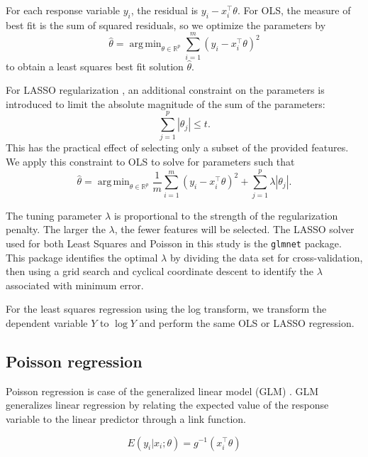 \documentclass[11pt]{report}
\DeclareMathOperator*{\argmin}{arg\,min}
\begin{document}
For each response variable $y_i$, the residual is $y_i - x_i^{\top}\theta$. For OLS, the measure of best fit is the sum of squared residuals, so we optimize the parameters by
\[\hat{\theta} = \argmin_{\theta\in\mathbb{R}^p}\sum_{i=1}^m \left(y_i - x_i^\top\theta\right)^2\] to obtain a least squares best fit solution $\hat{\theta}$.

For LASSO regularization \cite{Tibshirani1996}, an additional constraint on the parameters is introduced to limit the absolute magnitude of the sum of the parameters: 
\[\sum_{j=1}^p |\theta_j|\leq t.\] This has the practical effect of selecting only a subset of the provided features. We apply this constraint to OLS to solve for parameters such that
\[\hat{\theta} = \argmin_{\theta\in\mathbb{R}^p} \frac{1}{m}\sum_{i=1}^m \left(y_i - x_i^\top\theta\right)^2 + \sum_{j=1}^p\lambda\left|\theta_j\right|.\]

The tuning parameter $\lambda$ is proportional to the strength of the regularization penalty. The larger the $\lambda$, the fewer features will be selected. The LASSO solver used for both Least Squares and Poisson in this study is the \texttt{glmnet} package. This package identifies the optimal $\lambda$ by dividing the data set for cross-validation, then using a grid search and cyclical coordinate descent to identify the $\lambda$ associated with minimum error.

For the least squares regression using the log transform, we transform the dependent variable $Y$ to $\log{Y}$ and perform the same OLS or LASSO regression.

\subsection{Poisson regression} \label{sec:poiss}

Poisson regression is case of the generalized linear model (GLM) \cite{nelder1972}. GLM generalizes linear regression by relating the expected value of the response variable to the linear predictor through a link function. 

\[E(y_i|x_i;\theta) = g^{-1}(x_i^{\top} \theta)\]
\end{document}
